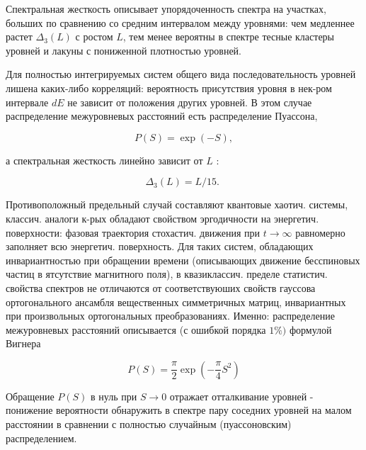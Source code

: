 \documentclass[10pt]{article}
\begin{document}
Спектральная жесткость описывает упорядоченность спектра на участках, больших по сравнению со средним интервалом между уровнями: чем медленнее растет $\Delta_{3}(L)$ с ростом $L$, тем менее вероятны в спектре тесные кластеры уровней и лакуны с пониженной плотностью уровней.



Для полностью интегрируемых систем общего вида последовательность уровней лишена каких-либо корреляций: вероятность присутствия уровня в нек-ром интервале $d E$ не зависит от положения других уровней. В этом случае распределение межуровневых расстояний есть распределение Пуассона,



\[

P(S)=\exp (-S),

\]



а спектральная жесткость линейно зависит от $L$ :



\[

\Delta_{3}(L)=L / 15 \text {. }

\]



Противоположный предельный случай составляют квантовые хаотич. системы, классич. аналоги к-рых обладают свойством эргодичности на энергетич. поверхности: фазовая траектория стохастич. движения при $t \rightarrow \infty$ равномерно заполняет всю энергетич. поверхность. Для таких систем, обладающих инвариантностью при обращении времени (описывающих движение бесспиновых частиц в ятсутствие магнитного поля), в квазиклассич. пределе статистич. свойства спектров не отличаются от соответствуюших свойств гауссова ортогонального ансамбля вещественных симметричных матриц, инвариантных при произвольных ортогональных преобразованиях. Именно: распределение межуровневых расстояний описывается (с ошибкой порядка $1 \%)$ формулой Вигнера



\[

P(S)=\frac{\pi}{2} \exp \left(-\frac{\pi}{4} S^{2}\right)

\]



Обращение $P(S)$ в нуль при $S \rightarrow 0$ отражает отталкивание уровней - понижение вероятности обнаружить в спектре пару соседних уровней на малом расстоянии в сравнении с полностью случайным (пуассоновским) распределением.
\end{document}
